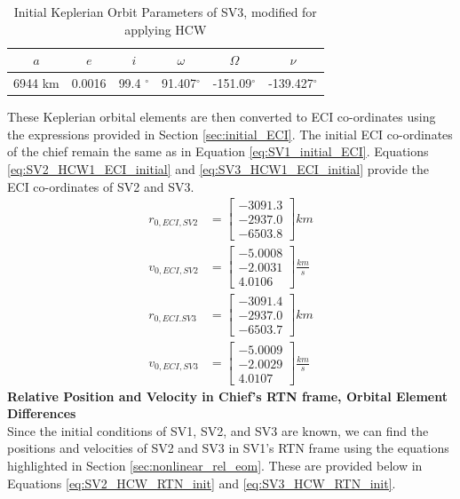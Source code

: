 \begin{table}[h]
\centering
\begin{tabular}{cccccc} \hline
    $a$ & $e$ & $i$ & $\omega$ & $\Omega$ & $\nu$ \\ \hline 
     6944 km & 0.0016 & 99.4 $^\circ$ & 91.407$^\circ$ & -151.09$^\circ$ & -139.427$^\circ$ \\ \hline
\end{tabular}
\caption{Initial Keplerian Orbit Parameters of SV3, modified for applying HCW}
\label{tab:abs_oe_kepler_SV3_HCW}
\end{table}

These Keplerian orbital elements are then converted to ECI co-ordinates using the expressions provided in Section \ref{sec:initial_ECI}. The initial ECI co-ordinates of the chief remain the same as in Equation \ref{eq:SV1_initial_ECI}. Equations \ref{eq:SV2_HCW1_ECI_initial} and \ref{eq:SV3_HCW1_ECI_initial} provide the ECI co-ordinates of SV2 and SV3. 
\begin{align} \label{eq:SV2_HCW1_ECI_initial}
    r_{0, ECI, SV2} &= \begin{bmatrix}
        -3091.3 \\
        -2937.0 \\
        -6503.8
    \end{bmatrix} km \\
    v_{0, ECI, SV2} &= \begin{bmatrix}
        -5.0008 \\
        -2.0031 \\
        4.0106
    \end{bmatrix} \frac{km}{s}
\end{align}
\begin{align} \label{eq:SV3_HCW1_ECI_initial}
    r_{0, ECI. SV3} &= \begin{bmatrix}
        -3091.4 \\
        -2937.0 \\
        -6503.7
    \end{bmatrix} km \\
    v_{0, ECI, SV3} &= \begin{bmatrix}
        -5.0009 \\
        -2.0029 \\
        4.0107
    \end{bmatrix} \frac{km}{s}
\end{align}
\textbf{Relative Position and Velocity in Chief's RTN frame, Orbital Element Differences} \\
Since the initial conditions of SV1, SV2, and SV3 are known, we can find the positions and velocities of SV2 and SV3 in SV1's RTN frame using the equations highlighted in Section \ref{sec:nonlinear_rel_eom}. These are provided below in Equations \ref{eq:SV2_HCW_RTN_init} and \ref{eq:SV3_HCW_RTN_init}.

